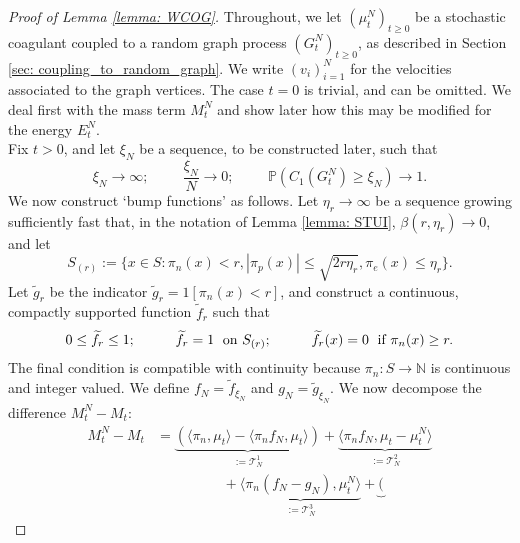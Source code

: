 \begin{proof}[Proof of Lemma \ref{lemma: WCOG}]   Throughout, we let $(\mu^N_t)_{t\geq 0}$ be a stochastic coagulant coupled to a random graph process $(G^N_t)_{t\geq 0}$, as described in Section \ref{sec: coupling_to_random_graph}. We write $(v_i)_{i=1}^N$ for the velocities associated to the graph vertices. The case $t=0$ is trivial, and can be omitted. We deal first with the mass term $M^N_t$ and show later how this may be modified for the energy $E^N_t.$ \medskip \\ Fix $t> 0$, and let $\xi_N$ be a sequence, to be constructed later, such that \begin{equation}\label{eq: choice of xiN for WCOG}
       \xi_N\rightarrow \infty; \hspace{1cm} \frac{\xi_N}{N}\rightarrow 0; \hspace{1cm}\mathbb{P}(C_1(G^N_t)\geq \xi_N)\rightarrow 1.
   \end{equation}  We now construct `bump functions' as follows.  Let $\eta_r\rightarrow \infty$ be a sequence growing sufficiently fast that, in the notation of Lemma \ref{lemma: STUI}, $\beta(r, \eta_r)\rightarrow 0$, and let
 \begin{equation}
       S_{(r)} := \{x \in S: \pi_n(x)< r, |\pi_p(x)|\leq \sqrt{2r\eta_r}, \pi_e(x)\leq \eta_r\}.
 \end{equation}
 Let $\widetilde{g}_r$ be the indicator $\widetilde{g}_r=1[\pi_n(x)< r]$, and construct a continuous, compactly supported function $\widetilde{f}_r$ such that
 \begin{equation}
      0\leq \widetilde{f}_r\leq 1;\hspace{1cm} \widetilde{f}_r=1 \hspace{0.1cm} \text{ on } S_{(r)};\hspace{1cm} \widetilde{f}_r(x)=0 \hspace{0.1cm} \text{ if } \pi_n(x)\ge r.
 \end{equation}
 The final condition is compatible with continuity because $\pi_n:S\rightarrow \mathbb{N}$ is continuous and integer valued. We define $f_N=\widetilde{f}_{\xi_N}$ and $g_N=\widetilde{g}_{\xi_N}$.  We now decompose the difference $M^N_t-M_t:$ \begin{equation}\label{eq: decomposition of erorr in WCOG}\begin{split} M^N_t-M_t &= \underbrace{(\langle \pi_n, \mu_t\rangle -\langle \pi_n f_N, \mu_t\rangle)}_{:=\mathcal{T}^1_N} + \underbrace{\langle \pi_n f_N, \mu_t-\mu^N_t\rangle}_{:=\mathcal{T}^2_N} \\[1ex]&\hspace{2cm}+ \underbrace{\langle \pi_n (f_N-g_N), \mu^N_t\rangle}_{:=\mathcal{T}^3_N} +\underbrace{(
}
\end{split}
\end{equation}
\end{proof}
